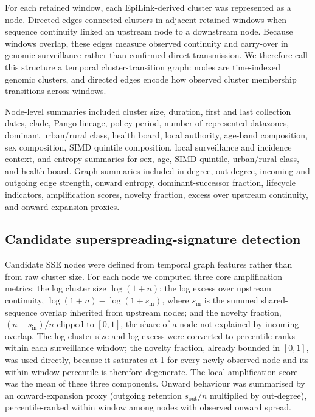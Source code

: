 \documentclass[10pt,letterpaper]{article}
\begin{document}
For each retained window, each EpiLink-derived cluster was represented as a node. Directed edges connected clusters in adjacent retained windows when sequence continuity linked an upstream node to a downstream node. Because windows overlap, these edges measure observed continuity and carry-over in genomic surveillance rather than confirmed direct transmission. We therefore call this structure a temporal cluster-transition graph: nodes are time-indexed genomic clusters, and directed edges encode how observed cluster membership transitions across windows.

Node-level summaries included cluster size, duration, first and last collection dates, clade, Pango lineage, policy period, number of represented datazones, dominant urban/rural class, health board, local authority, age-band composition, sex composition, SIMD quintile composition, local surveillance and incidence context, and entropy summaries for sex, age, SIMD quintile, urban/rural class, and health board. Graph summaries included in-degree, out-degree, incoming and outgoing edge strength, onward entropy, dominant-successor fraction, lifecycle indicators, amplification scores, novelty fraction, excess over upstream continuity, and onward expansion proxies.

\subsection*{Candidate superspreading-signature detection}

Candidate SSE nodes were defined from temporal graph features rather than from raw cluster size. For each node we computed three core amplification metrics: the log cluster size $\log(1+n)$; the log excess over upstream continuity, $\log(1+n) - \log(1+s_{\mathrm{in}})$, where $s_{\mathrm{in}}$ is the summed shared-sequence overlap inherited from upstream nodes; and the novelty fraction, $(n - s_{\mathrm{in}})/n$ clipped to $[0,1]$, the share of a node not explained by incoming overlap. The log cluster size and log excess were converted to percentile ranks within each surveillance window; the novelty fraction, already bounded in $[0,1]$, was used directly, because it saturates at 1 for every newly observed node and its within-window percentile is therefore degenerate. The local amplification score was the mean of these three components. Onward behaviour was summarised by an onward-expansion proxy (outgoing retention $s_{\mathrm{out}}/n$ multiplied by out-degree), percentile-ranked within window among nodes with observed onward spread.
\end{document}
